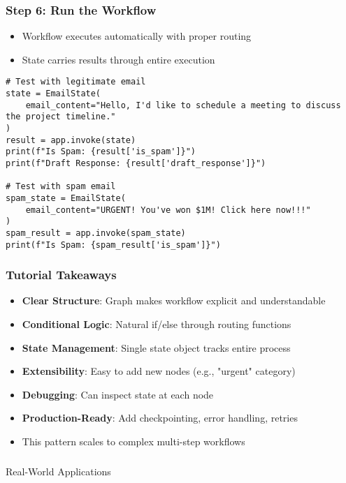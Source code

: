 \begin{frame}[fragile]\frametitle{Step 6: Run the Workflow}

      \begin{itemize}
        \item Workflow executes automatically with proper routing
        \item State carries results through entire execution
      \end{itemize}
	  
      \begin{lstlisting}
# Test with legitimate email
state = EmailState(
    email_content="Hello, I'd like to schedule a meeting to discuss the project timeline."
)
result = app.invoke(state)
print(f"Is Spam: {result['is_spam']}")
print(f"Draft Response: {result['draft_response']}")

# Test with spam email
spam_state = EmailState(
    email_content="URGENT! You've won $1M! Click here now!!!"
)
spam_result = app.invoke(spam_state)
print(f"Is Spam: {spam_result['is_spam']}")
      \end{lstlisting}
      

\end{frame}

\begin{frame}[fragile]\frametitle{Tutorial Takeaways}
      \begin{itemize}
        \item \textbf{Clear Structure}: Graph makes workflow explicit and understandable
        \item \textbf{Conditional Logic}: Natural if/else through routing functions
        \item \textbf{State Management}: Single state object tracks entire process
        \item \textbf{Extensibility}: Easy to add new nodes (e.g., "urgent" category)
        \item \textbf{Debugging}: Can inspect state at each node
        \item \textbf{Production-Ready}: Add checkpointing, error handling, retries
        \item This pattern scales to complex multi-step workflows
      \end{itemize}
\end{frame}

\begin{frame}[fragile]\frametitle{}
\begin{center}
{\Large Real-World Applications}
\end{center}
\end{frame}

